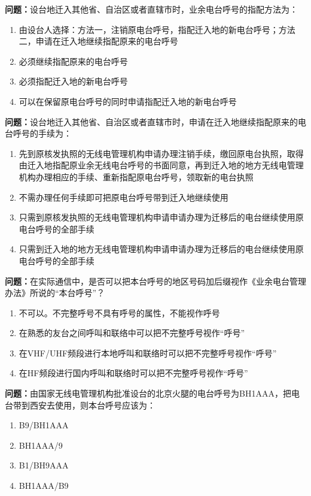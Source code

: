 \documentclass{ctexbook}
\begin{document}
\textbf{问题：}设台地迁入其他省、自治区或者直辖市时，业余电台呼号的指配方法为：
\begin{enumerate}[label=\Alph*), leftmargin=3em]
\item 由设台人选择：方法一，注销原电台呼号，指配迁入地的新电台呼号；方法二，申请在迁入地继续指配原来的电台呼号
\item 必须继续指配原来的电台呼号
\item 必须指配迁入地的新电台呼号
\item 可以在保留原电台呼号的同时申请指配迁入地的新电台呼号
\end{enumerate}

\textbf{问题：}设台地迁入其他省、自治区或者直辖市时，申请在迁入地继续指配原来的电台呼号的手续为：
\begin{enumerate}[label=\Alph*), leftmargin=3em]
\item 先到原核发执照的无线电管理机构申请办理注销手续，缴回原电台执照，取得由迁入地指配原业余无线电台呼号的书面同意，再到迁入地的地方无线电管理机构办理相应的手续、重新指配原电台呼号，领取新的电台执照
\item 不需办理任何手续即可把原电台呼号带到迁入地继续使用
\item 只需到原核发执照的无线电管理机构申请申请办理为迁移后的电台继续使用原电台呼号的全部手续
\item 只需到迁入地的地方无线电管理机构申请申请办理为迁移后的电台继续使用原电台呼号的全部手续
\end{enumerate}

\textbf{问题：}在实际通信中，是否可以把本台呼号的地区号码加后缀视作《业余电台管理办法》所说的“本台呼号”？
\begin{enumerate}[label=\Alph*), leftmargin=3em]
\item 不可以。不完整呼号不具有呼号的属性，不能视作呼号
\item 在熟悉的友台之间呼叫和联络中可以把不完整呼号视作“呼号”
\item 在VHF/UHF频段进行本地呼叫和联络时可以把不完整呼号视作“呼号”
\item 在HF频段进行国内呼叫和联络时可以把不完整呼号视作“呼号”
\end{enumerate}

\textbf{问题：}由国家无线电管理机构批准设台的北京火腿的电台呼号为BH1AAA，把电台带到西安去使用，则本台呼号应该为：
\begin{enumerate}[label=\Alph*), leftmargin=3em]
\item B9/BH1AAA
\item BH1AAA/9
\item B1/BH9AAA
\item BH1AAA/B9
\end{enumerate}
\end{document}
